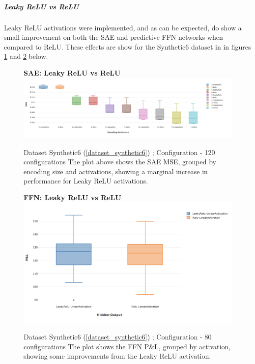 \documentclass[a4paper,11pt,oneside]{article}
\theoremstyle{plain}
\theoremstyle{definition}
\begin{document}
\subparagraph{Leaky ReLU vs ReLU}

Leaky ReLU activations were implemented, and as can be expected, do show a small improvement on both the SAE and predictive FFN networks when compared to ReLU. These effects are show for the Synthetic6 dataset in in figures \ref{figure-results_leaky_relu_1} and \ref{figure-results_leaky_relu_3} below. 

\begin{figure}[H]
	\centering 
	\textbf{SAE: Leaky ReLU vs ReLU} 
	\includegraphics[scale=0.28]{images/results/linearity/relu_leaky_relu.png}
	\caption{Dataset Synthetic6  (\ref{dataset_synthetic6}) ; Configuration  - 120 configurations
		\newline \newline The plot above shows the SAE MSE, grouped by encoding size and activations, showing a marginal increase in performance for Leaky ReLU activations. }
	\label{figure-results_leaky_relu_1}
\end{figure}

\begin{figure}[H]
	\textbf{FFN: Leaky ReLU vs ReLU}
	\centering
	\includegraphics[scale=0.35]{images/results/linearity/leaky_relu_ffn.png}
	\caption{Dataset Synthetic6  (\ref{dataset_synthetic6}) ; Configuration - 80 configurations
		\newline \newline The plot shows the FFN P\&L, grouped by activation, showing some improvements from the Leaky ReLU activation.}
	\label{figure-results_leaky_relu_3}
\end{figure}
\end{document}
